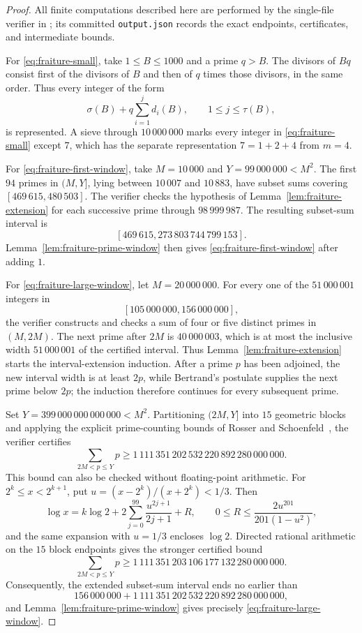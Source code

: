 \begin{proof}
All finite computations described here are performed by the single-file
verifier in \cite{FraitureVerifier}; its committed \texttt{output.json}
records the exact endpoints, certificates, and intermediate bounds.

For \eqref{eq:fraiture-small}, take $1\leq B\leq1000$ and a prime $q>B$.
The divisors of $Bq$ consist first of the divisors of $B$ and then of $q$
times those divisors, in the same order.  Thus every integer of the form
\[
 \sigma(B)+q\sum_{i=1}^j d_i(B),
 \qquad 1\leq j\leq\tau(B),
\]
is represented.  A sieve through $10\,000\,000$ marks every integer in
\eqref{eq:fraiture-small} except $7$, which has the separate
representation $7=1+2+4$ from $m=4$.

For \eqref{eq:fraiture-first-window}, take $M=10\,000$ and
$Y=99\,000\,000<M^2$.  The first $94$ primes in $(M,Y]$, lying between
$10\,007$ and $10\,883$, have subset sums covering
$[469\,615,480\,503]$.  The verifier checks the hypothesis of
Lemma~\ref{lem:fraiture-extension} for each successive prime through
$98\,999\,987$.  The resulting subset-sum interval is
\[
 [469\,615,273\,803\,744\,799\,153].
\]
Lemma~\ref{lem:fraiture-prime-window} then gives
\eqref{eq:fraiture-first-window} after adding $1$.

For \eqref{eq:fraiture-large-window}, let $M=20\,000\,000$.
For every one of the $51\,000\,001$ integers in
\[
 [105\,000\,000,156\,000\,000],
\]
the verifier constructs and checks a sum of four or five distinct primes
in $(M,2M)$.  The next prime after $2M$ is $40\,000\,003$, which is at
most the inclusive width $51\,000\,001$ of the certified interval.  Thus
Lemma~\ref{lem:fraiture-extension} starts the interval-extension
induction.  After a prime $p$ has been adjoined, the new interval width is
at least $2p$, while Bertrand's postulate supplies the next prime below
$2p$; the induction therefore continues for every subsequent prime.

Set $Y=399\,000\,000\,000\,000<M^2$.  Partitioning $(2M,Y]$ into
$15$ geometric blocks and applying the explicit prime-counting bounds of
Rosser and Schoenfeld~\cite{RosserSchoenfeld}, the verifier certifies
\[
 \sum_{2M<p\leq Y}p
 \geq
 1\,111\,351\,202\,532\,220\,892\,280\,000\,000.
\]
This bound can also be checked without floating-point arithmetic.  For
$2^k\leq x<2^{k+1}$, put $u=(x-2^k)/(x+2^k)<1/3$.  Then
\[
 \log x
 =k\log2+2\sum_{j=0}^{99}\frac{u^{2j+1}}{2j+1}+R,
 \qquad
 0\leq R\leq\frac{2u^{201}}{201(1-u^2)},
\]
and the same expansion with $u=1/3$ encloses $\log2$.  Directed rational
arithmetic on the $15$ block endpoints gives the stronger certified bound
\[
 \sum_{2M<p\leq Y}p
 \geq
 1\,111\,351\,203\,106\,177\,132\,280\,000\,000.
\]
Consequently, the extended subset-sum interval ends no earlier than
\[
 156\,000\,000+
 1\,111\,351\,202\,532\,220\,892\,280\,000\,000,
\]
and Lemma~\ref{lem:fraiture-prime-window} gives precisely
\eqref{eq:fraiture-large-window}.
\end{proof}

